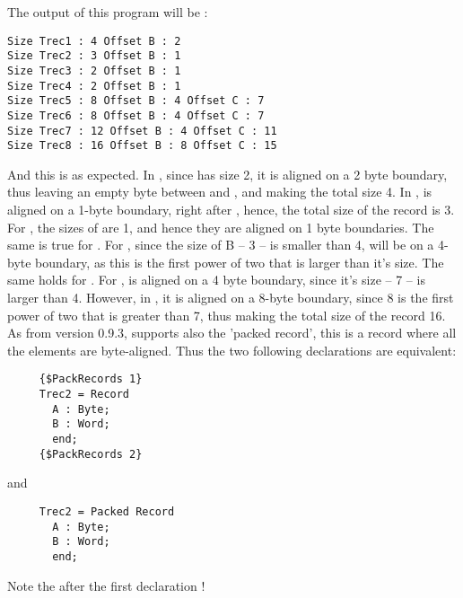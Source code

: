 \documentclass{report}
\begin{document}
The output of this program will be :
\begin{verbatim}
Size Trec1 : 4 Offset B : 2
Size Trec2 : 3 Offset B : 1
Size Trec3 : 2 Offset B : 1
Size Trec4 : 2 Offset B : 1
Size Trec5 : 8 Offset B : 4 Offset C : 7
Size Trec6 : 8 Offset B : 4 Offset C : 7
Size Trec7 : 12 Offset B : 4 Offset C : 11
Size Trec8 : 16 Offset B : 8 Offset C : 15
\end{verbatim}
And this is as expected. In , since  has size 2, it is
aligned on a 2 byte boundary, thus leaving an empty byte between 
and , and making the total size 4. In ,  is aligned
on a 1-byte boundary, right after , hence, the total size of the
record is 3.
For , the sizes of  are 1, and hence they are aligned on 1
byte boundaries. The same is true for .
For , since the size of B -- 3 -- is smaller than 4,  will
be on a  4-byte boundary, as this is the first power of two that is
larger than it's size. The same holds for .
For ,  is aligned on a 4 byte boundary, since it's size --
7 -- is larger than 4. However, in , it is aligned on a 8-byte
boundary, since 8 is the first power of two that is greater than 7, thus
making the total size of the record 16.
As from version 0.9.3, \fpc supports also the 'packed record', this is a
record where all the elements are byte-aligned.
Thus the two following declarations are equivalent:
\begin{verbatim}
     {$PackRecords 1}
     Trec2 = Record
       A : Byte;
       B : Word;
       end;
     {$PackRecords 2}
\end{verbatim}
and
\begin{verbatim}
     Trec2 = Packed Record
       A : Byte;
       B : Word;
       end;
\end{verbatim}
Note the  after the first declaration !
\end{document}
